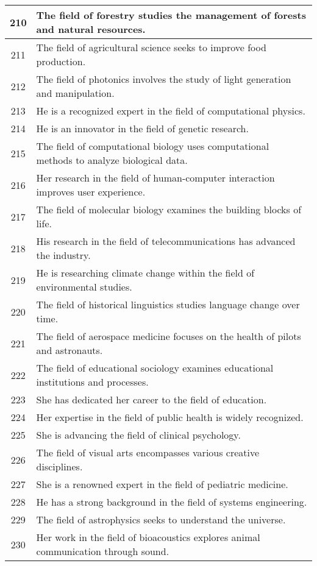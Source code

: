 \begin{longtable}{|c|p{12cm}|}
210 & The field of forestry studies the management of forests and natural resources. \\ \hline
211 & The field of agricultural science seeks to improve food production. \\ \hline
212 & The field of photonics involves the study of light generation and manipulation. \\ \hline
213 & He is a recognized expert in the field of computational physics. \\ \hline
214 & He is an innovator in the field of genetic research. \\ \hline
215 & The field of computational biology uses computational methods to analyze biological data. \\ \hline
216 & Her research in the field of human-computer interaction improves user experience. \\ \hline
217 & The field of molecular biology examines the building blocks of life. \\ \hline
218 & His research in the field of telecommunications has advanced the industry. \\ \hline
219 & He is researching climate change within the field of environmental studies. \\ \hline
220 & The field of historical linguistics studies language change over time. \\ \hline
221 & The field of aerospace medicine focuses on the health of pilots and astronauts. \\ \hline
222 & The field of educational sociology examines educational institutions and processes. \\ \hline
223 & She has dedicated her career to the field of education. \\ \hline
224 & Her expertise in the field of public health is widely recognized. \\ \hline
225 & She is advancing the field of clinical psychology. \\ \hline
226 & The field of visual arts encompasses various creative disciplines. \\ \hline
227 & She is a renowned expert in the field of pediatric medicine. \\ \hline
228 & He has a strong background in the field of systems engineering. \\ \hline
229 & The field of astrophysics seeks to understand the universe. \\ \hline
230 & Her work in the field of bioacoustics explores animal communication through sound. \\ \hline

\end{longtable}
